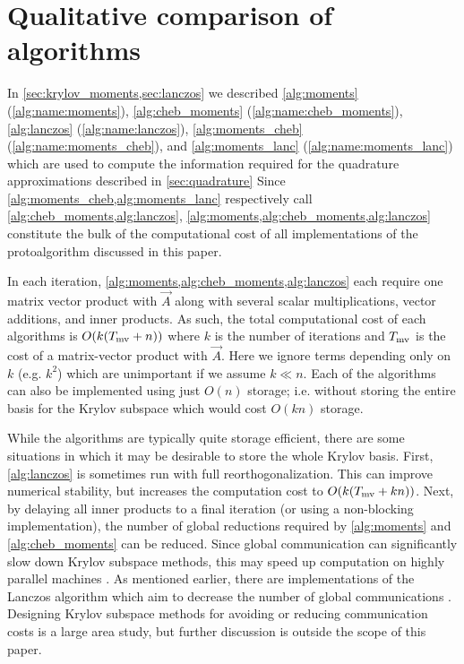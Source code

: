 \section{Qualitative comparison of algorithms}
\label{sec:QF_tradeoffs}


In \cref{sec:krylov_moments,sec:lanczos} we described \cref{alg:moments} (\ref{alg:name:moments}), \cref{alg:cheb_moments} (\ref{alg:name:cheb_moments}), \cref{alg:lanczos} (\ref{alg:name:lanczos}), \cref{alg:moments_cheb} (\ref{alg:name:moments_cheb}), and \cref{alg:moments_lanc} (\ref{alg:name:moments_lanc}) which are used to compute the information required for the quadrature approximations described in \cref{sec:quadrature}
Since \cref{alg:moments_cheb,alg:moments_lanc} respectively call \cref{alg:cheb_moments,alg:lanczos}, \cref{alg:moments,alg:cheb_moments,alg:lanczos} constitute the bulk of the computational cost of all implementations of the protoalgorithm discussed in this paper.

In each iteration, \cref{alg:moments,alg:cheb_moments,alg:lanczos} each require one matrix vector product with \( \vec{A} \) along with several scalar multiplications, vector additions, and inner products.
As such, the total computational cost of each algorithms is \( O(k(T_{\textup{mv}} + n)) \) where \( k \) is the number of iterations and \( T_{\textup{mv}} \) is the cost of a matrix-vector product with \( \vec{A} \).
Here we ignore terms depending only on \( k \) (e.g. \( k^2 \)) which are unimportant if we assume \( k\ll n \).
Each of the algorithms can also be implemented using just \( O(n) \) storage; i.e. without storing the entire basis for the Krylov subspace which would cost \( O(kn) \) storage.


While the algorithms are typically quite storage efficient, there are some situations in which it may be desirable to store the whole Krylov basis.
First, \cref{alg:lanczos} is sometimes run with full reorthogonalization.
This can improve numerical stability, but increases the computation cost to \( O(k(T_{\textup{mv}} + kn)) \).
Next, by delaying all inner products to a final iteration (or using a non-blocking implementation), the number of global reductions required by \cref{alg:moments} and \cref{alg:cheb_moments} can be reduced.
Since global communication can significantly slow down Krylov subspace methods, this may speed up computation on highly parallel machines \cite{dongarra_heroux_luszczek_15,exascale}.
As mentioned earlier, there are implementations of the Lanczos algorithm which aim to decrease the number of global communications \cite{carson_demmel_15,carson_20}.
Designing Krylov subspace methods for avoiding or reducing communication costs is a large area study, but further discussion is outside the scope of this paper. 



